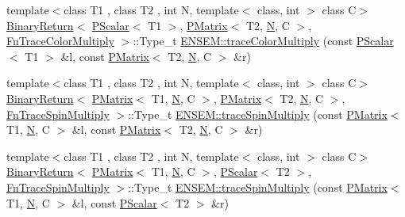 \begin{DoxyCompactItemize}
\item 
{\footnotesize template$<$class T1 , class T2 , int N, template$<$ class, int $>$ class C$>$ }\\\mbox{\hyperlink{structENSEM_1_1BinaryReturn}{Binary\+Return}}$<$ \mbox{\hyperlink{classENSEM_1_1PScalar}{P\+Scalar}}$<$ T1 $>$, \mbox{\hyperlink{classENSEM_1_1PMatrix}{P\+Matrix}}$<$ T2, \mbox{\hyperlink{operator__name__util_8cc_a7722c8ecbb62d99aee7ce68b1752f337}{N}}, C $>$, \mbox{\hyperlink{structENSEM_1_1FnTraceColorMultiply}{Fn\+Trace\+Color\+Multiply}} $>$\+::Type\+\_\+t \mbox{\hyperlink{group__primmatrix_gad73631cec5794d9c294bbf815af14cc0}{E\+N\+S\+E\+M\+::trace\+Color\+Multiply}} (const \mbox{\hyperlink{classENSEM_1_1PScalar}{P\+Scalar}}$<$ T1 $>$ \&l, const \mbox{\hyperlink{classENSEM_1_1PMatrix}{P\+Matrix}}$<$ T2, \mbox{\hyperlink{operator__name__util_8cc_a7722c8ecbb62d99aee7ce68b1752f337}{N}}, C $>$ \&r)
\item 
{\footnotesize template$<$class T1 , class T2 , int N, template$<$ class, int $>$ class C$>$ }\\\mbox{\hyperlink{structENSEM_1_1BinaryReturn}{Binary\+Return}}$<$ \mbox{\hyperlink{classENSEM_1_1PMatrix}{P\+Matrix}}$<$ T1, \mbox{\hyperlink{operator__name__util_8cc_a7722c8ecbb62d99aee7ce68b1752f337}{N}}, C $>$, \mbox{\hyperlink{classENSEM_1_1PMatrix}{P\+Matrix}}$<$ T2, \mbox{\hyperlink{operator__name__util_8cc_a7722c8ecbb62d99aee7ce68b1752f337}{N}}, C $>$, \mbox{\hyperlink{structENSEM_1_1FnTraceSpinMultiply}{Fn\+Trace\+Spin\+Multiply}} $>$\+::Type\+\_\+t \mbox{\hyperlink{group__primmatrix_gabc920df179ac4bd2438224848ec237af}{E\+N\+S\+E\+M\+::trace\+Spin\+Multiply}} (const \mbox{\hyperlink{classENSEM_1_1PMatrix}{P\+Matrix}}$<$ T1, \mbox{\hyperlink{operator__name__util_8cc_a7722c8ecbb62d99aee7ce68b1752f337}{N}}, C $>$ \&l, const \mbox{\hyperlink{classENSEM_1_1PMatrix}{P\+Matrix}}$<$ T2, \mbox{\hyperlink{operator__name__util_8cc_a7722c8ecbb62d99aee7ce68b1752f337}{N}}, C $>$ \&r)
\item 
{\footnotesize template$<$class T1 , class T2 , int N, template$<$ class, int $>$ class C$>$ }\\\mbox{\hyperlink{structENSEM_1_1BinaryReturn}{Binary\+Return}}$<$ \mbox{\hyperlink{classENSEM_1_1PMatrix}{P\+Matrix}}$<$ T1, \mbox{\hyperlink{operator__name__util_8cc_a7722c8ecbb62d99aee7ce68b1752f337}{N}}, C $>$, \mbox{\hyperlink{classENSEM_1_1PScalar}{P\+Scalar}}$<$ T2 $>$, \mbox{\hyperlink{structENSEM_1_1FnTraceSpinMultiply}{Fn\+Trace\+Spin\+Multiply}} $>$\+::Type\+\_\+t \mbox{\hyperlink{group__primmatrix_gab5fbf23688b38c3209c80d2a9a22b3d0}{E\+N\+S\+E\+M\+::trace\+Spin\+Multiply}} (const \mbox{\hyperlink{classENSEM_1_1PMatrix}{P\+Matrix}}$<$ T1, \mbox{\hyperlink{operator__name__util_8cc_a7722c8ecbb62d99aee7ce68b1752f337}{N}}, C $>$ \&l, const \mbox{\hyperlink{classENSEM_1_1PScalar}{P\+Scalar}}$<$ T2 $>$ \&r)

\end{DoxyCompactItemize}
